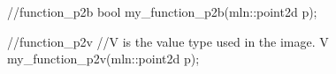 //function_p2b
bool my_function_p2b(mln::point2d p);

//function_p2v
//V is the value type used in the image.
V my_function_p2v(mln::point2d p);
